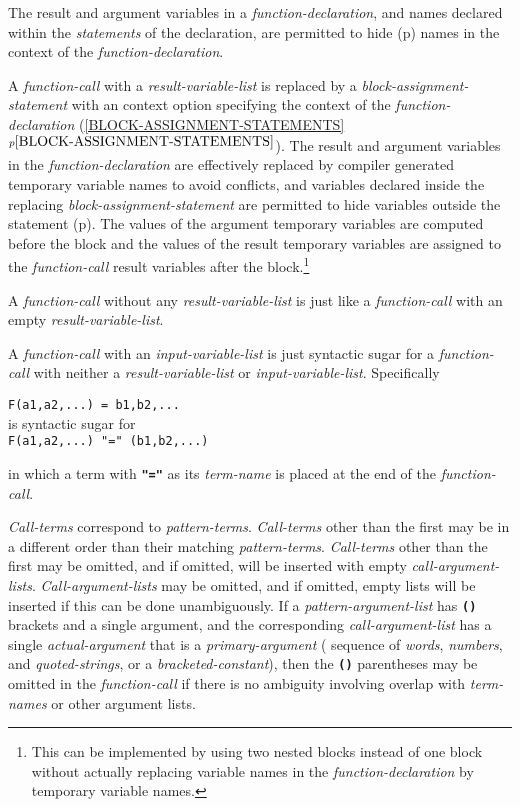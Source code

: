 \documentclass[12pt]{article}
\newcommand{\TT}[1]{{\tt \bfseries #1}}
\newcommand{\itemref}[1]{\ref{#1}$^{p\pageref{#1}}$}
\newcommand{\pagref}[1]{p\pageref{#1}}
\begin{document}
The result and argument variables in a
{\em function-declaration},
and names declared within the {\em statements} of the declaration,
are permitted to hide (\pagref{HIDE})
names in the context of the {\em function-declara\-tion}.

A {\em function-call} with a {\em result-variable-list}
is replaced by a {\em block-assignment-statement}
with an context option specifying the context of the
{\em function-declaration}
(\itemref{BLOCK-ASSIGNMENT-STATEMENTS}).
The result and argument variables in the {\em function-declaration}
are effectively replaced by compiler generated temporary variable names to
avoid conflicts, and variables declared inside the replacing
{\em block-assignment-statement} are permitted to hide variables outside
the statement (\pagref{HIDE}).  The values of the argument temporary
variables are computed before the block and the values of the result
temporary variables are assigned to the {\em function-call} result
variables after the block.\footnote{This can be implemented by using
two nested blocks instead of one block without actually replacing
variable names in the {\em function-declaration} by temporary variable
names.}

A {\em function-call} without any {\em result-variable-list}
is just like a {\em function-call} with an empty
{\em result-variable-list}.

A {\em function-call} with an {\em input-variable-list} is just syntactic
sugar for a {\em function-call} with neither a {\em result-variable-list}
or {\em input-variable-list}.  Specifically
\begin{center}
{\tt F(a1,a2,...)~=~b1,b2,...} \\
is syntactic sugar for \\
{\tt F(a1,a2,...)~"="~(b1,b2,...)} \\
\end{center}

in which a term with \TT{"="} as its {\em term-name} is
placed at the end of the {\em function-call}.

{\em Call-terms} correspond to {\em pattern-terms}.  {\em Call-terms}
other than the first may be in a different order than their matching
{\em pattern-terms}.  {\em Call-terms} other than the first may be
omitted, and if omitted, will be inserted with empty {\em call-argument-lists}.
{\em Call-argument-lists} may be omitted, and if omitted, empty
lists will be inserted if this can be done unambiguously.
If a {\em pattern-argument-list} has \TT{()} brackets and a single
argument, and the corresponding {\em call-argument-list} has a single
{\em actual-argument} that
is a {\em primary-argument} ( sequence of {\em words}, {\em numbers},
and {\em quoted-strings}, or a {\em bracketed-constant}), then
the \TT{()} parentheses may be omitted in the {\em function-call}
if there is no ambiguity involving overlap with {\em term-names} or
other argument lists.
\end{document}
